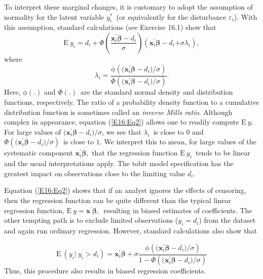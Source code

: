 To interpret these marginal changes, it is customary to adopt the
assumption of normality for the latent variable $y_i^{\ast}$\ (or
equivalently for the disturbance $\varepsilon_i$). With this
assumption, standard calculations (see Exercise 16.1) show that
\begin{equation}\label{E16:Eq2}
\mathrm{E~}y_i = d_i+\Phi \left( \frac{\mathbf{x}_i^{\prime}
\boldsymbol \beta - d_i}{\sigma }\right) \left(
\mathbf{x}_i^{\prime}\boldsymbol \beta -d_i\mathbf{+}\sigma
\lambda_i\right) ,
\end{equation}
where
\begin{equation*}
\lambda_i=\frac{\mathrm{\phi }\left( (\mathbf{x}_i^{\prime}
\boldsymbol \beta - d_i\mathbf{)/}\sigma \right) }{\Phi \left(
(\mathbf{x}_i^{\prime} \boldsymbol \beta - d_i \mathbf{)/}\sigma
\right) }.
\end{equation*}
Here, $\mathrm{\phi (.)}$ and $\Phi (.)$\ are the standard normal
density and distribution functions, respectively. The ratio of a
probability density function to a cumulative distribution function
is sometimes called an \emph{inverse Mills ratio}. Although complex
in appearance, equation (\ref{E16:Eq2}) allows one to readily
compute $\mathrm{E~} y $. For large values of
$(\mathbf{x}_i^{\prime}\boldsymbol \beta - d_i\mathbf{)/}\sigma $,
we see that $\lambda_i$\ is close to $0$ and $ \Phi \left(
(\mathbf{x}_i^{\prime}\boldsymbol \beta -d_i\mathbf{)/ }\sigma
\right) $\ is close to $1$. We interpret this to mean, for large
values of the systematic component $\mathbf{x}_i^{\prime}\boldsymbol
\beta,$ that the regression function $\mathrm{E~}y_i$\ tends to be
linear and the usual interpretations apply. The tobit model
specification has the greatest impact on observations close to the
limiting value $d_i$.


Equation (\ref{E16:Eq2}) shows that if an analyst ignores the
effects of censoring, then the regression function can be quite
different than the typical linear regression function,
$\mathrm{E~}y=\mathbf{x}^{\prime}\boldsymbol \beta ,$\ resulting in
biased estimates of coefficients. The other tempting path is to
exclude limited observations ($y_i=d_i$) from the dataset and again
run ordinary regression. However, standard calculations also show
that

\begin{equation}
\mathrm{E~}\left( y_i|\ y_i>d_i\right)
=\mathbf{x}_i^{\prime}\boldsymbol \beta + \sigma \frac{\mathrm{\phi
}\left( (\mathbf{x}_i^{\prime} \boldsymbol \beta -
d_i\mathbf{)/}\sigma \right) }{1-\Phi \left( (\mathbf{x}_i^{\prime}
\boldsymbol \beta - d_i \mathbf{)/}\sigma \right) }
\end{equation}
Thus, this procedure also results in biased regression coefficients.

